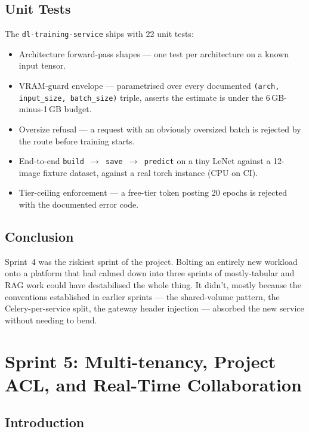 \documentclass[12pt, a4paper]{report}
\begin{document}
\section{Unit Tests}

The \texttt{dl-training-service} ships with 22 unit tests:

\begin{itemize}
    \item Architecture forward-pass shapes --- one test per
        architecture on a known input tensor.
    \item VRAM-guard envelope --- parametrised over every
        documented \texttt{(arch, input\_size, batch\_size)}
        triple, asserts the estimate is under the 6\,GB-minus-1\,GB
        budget.
    \item Oversize refusal --- a request with an obviously
        oversized batch is rejected by the route before training
        starts.
    \item End-to-end \texttt{build $\to$ save $\to$ predict} on
        a tiny LeNet against a 12-image fixture dataset, against
        a real torch instance (CPU on CI).
    \item Tier-ceiling enforcement --- a free-tier token posting
        20 epochs is rejected with the documented error code.
\end{itemize}

\section*{Conclusion}

Sprint~4 was the riskiest sprint of the project. Bolting an
entirely new workload onto a platform that had calmed down into
three sprints of mostly-tabular and RAG work could have
destabilised the whole thing. It didn't, mostly because the
conventions established in earlier sprints --- the shared-volume
pattern, the Celery-per-service split, the gateway header injection
--- absorbed the new service without needing to bend.

\chapter{Sprint 5: Multi-tenancy, Project ACL, and Real-Time Collaboration}

\section*{Introduction}
\end{document}
